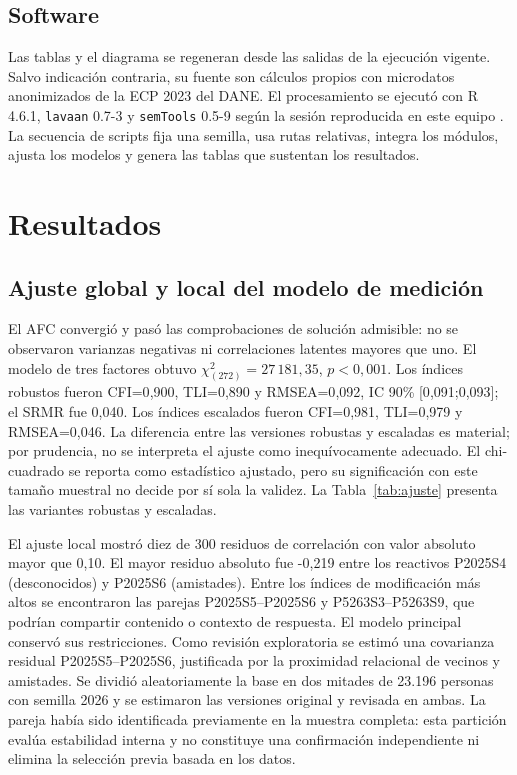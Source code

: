 \documentclass[11pt,letterpaper]{article}
\begin{document}
\subsection{Software}

Las tablas y el diagrama se regeneran desde las salidas de la ejecución vigente. Salvo indicación contraria, su fuente son cálculos propios con microdatos anonimizados de la ECP 2023 del DANE. El procesamiento se ejecutó con R 4.6.1, \texttt{lavaan} 0.7-3 y \texttt{semTools} 0.5-9 según la sesión reproducida en este equipo \citep{RCore2026,Rosseel2012,Jorgensen2022}. La secuencia de scripts fija una semilla, usa rutas relativas, integra los módulos, ajusta los modelos y genera las tablas que sustentan los resultados.

\section{Resultados}
\label{sec:resultados}

\subsection{Ajuste global y local del modelo de medición}

El AFC convergió y pasó las comprobaciones de solución admisible: no se observaron varianzas negativas ni correlaciones latentes mayores que uno. El modelo de tres factores obtuvo \(\chi^2_{(272)}=27\,181{,}35\), \(p<0{,}001\). Los índices robustos fueron CFI=0{,}900, TLI=0{,}890 y RMSEA=0{,}092, IC 90\% [0{,}091;0{,}093]; el SRMR fue 0{,}040. Los índices escalados fueron CFI=0{,}981, TLI=0{,}979 y RMSEA=0{,}046. La diferencia entre las versiones robustas y escaladas es material; por prudencia, no se interpreta el ajuste como inequívocamente adecuado. El chi-cuadrado se reporta como estadístico ajustado, pero su significación con este tamaño muestral no decide por sí sola la validez. La Tabla~\ref{tab:ajuste} presenta las variantes robustas y escaladas.



El ajuste local mostró diez de 300 residuos de correlación con valor absoluto mayor que 0{,}10. El mayor residuo absoluto fue -0{,}219 entre los reactivos P2025S4 (desconocidos) y P2025S6 (amistades). Entre los índices de modificación más altos se encontraron las parejas P2025S5--P2025S6 y P5263S3--P5263S9, que podrían compartir contenido o contexto de respuesta. El modelo principal conservó sus restricciones. Como revisión exploratoria se estimó una covarianza residual P2025S5--P2025S6, justificada por la proximidad relacional de vecinos y amistades. Se dividió aleatoriamente la base en dos mitades de 23.196 personas con semilla 2026 y se estimaron las versiones original y revisada en ambas. La pareja había sido identificada previamente en la muestra completa: esta partición evalúa estabilidad interna y no constituye una confirmación independiente ni elimina la selección previa basada en los datos.
\end{document}
